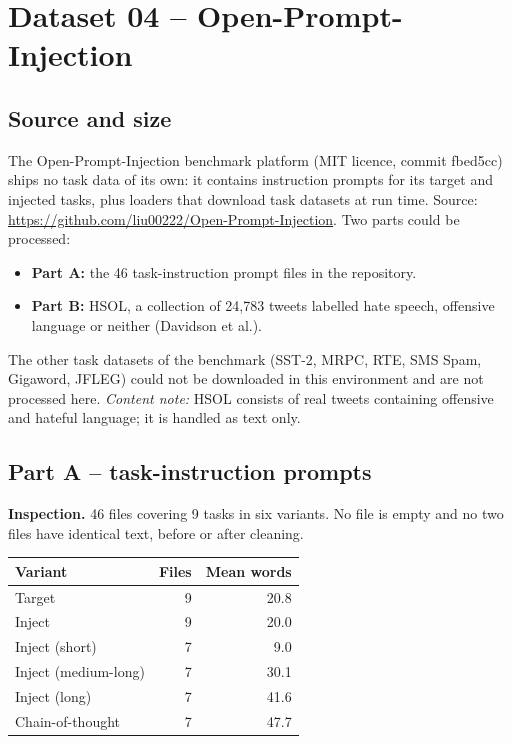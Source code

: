 \documentclass[11pt,a4paper]{article}
\newcommand{\hdr}[1]{\textbf{#1}}
\begin{document}
\section{Dataset 04 -- Open-Prompt-Injection}
\subsection{Source and size}
The Open-Prompt-Injection benchmark platform (MIT licence, commit fbed5cc) ships no task data of its own: it contains instruction prompts for its target and injected tasks, plus loaders that download task datasets at run time. Source: \url{https://github.com/liu00222/Open-Prompt-Injection}. Two parts could be processed:
\begin{itemize}
\item \textbf{Part A:} the 46 task-instruction prompt files in the repository.
\item \textbf{Part B:} HSOL, a collection of 24{,}783 tweets labelled hate speech, offensive language or neither (Davidson et al.).
\end{itemize}
The other task datasets of the benchmark (SST-2, MRPC, RTE, SMS Spam, Gigaword, JFLEG) could not be downloaded in this environment and are not processed here. \emph{Content note:} HSOL consists of real tweets containing offensive and hateful language; it is handled as text only.

\subsection{Part A -- task-instruction prompts}
\textbf{Inspection.} 46 files covering 9 tasks in six variants. No file is empty and no two files have identical text, before or after cleaning.\par\smallskip
\begin{tabularx}{\textwidth}{@{}L{4cm}r r@{}}
\toprule
{}\hdr{Variant} & \hdr{Files} & \hdr{Mean words}\\
\midrule
Target & 9 & 20.8\\
Inject & 9 & 20.0\\
Inject (short) & 7 & 9.0\\
Inject (medium-long) & 7 & 30.1\\
Inject (long) & 7 & 41.6\\
Chain-of-thought & 7 & 47.7\\
\bottomrule
\end{tabularx}
\end{document}

